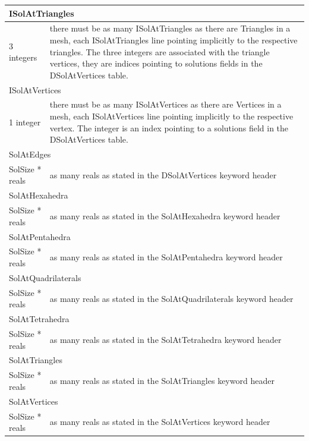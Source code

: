 \documentclass[a4paper,12pt]{article}
\begin{document}
\begin{longtable}{|m{4cm}|m{11cm}|}
\multicolumn{2}{|l|}{ISolAtTriangles} \\
\hline
3 integers & there must be as many ISolAtTriangles as there are Triangles in a mesh, each ISolAtTriangles line pointing implicitly to the respective triangles. The three integers are associated with the triangle vertices, they are indices pointing to solutions fields in the DSolAtVertices table. \\
\hline\hline

\multicolumn{2}{|l|}{ISolAtVertices} \\
\hline
1 integer & there must be as many ISolAtVertices as there are Vertices in a mesh, each ISolAtVertices line pointing implicitly to the respective vertex. The integer is an index pointing to a solutions field in the DSolAtVertices table. \\
\hline\hline

\multicolumn{2}{|l|}{SolAtEdges} \\
\hline
SolSize * reals & as many reals as stated in the DSolAtVertices keyword header \\
\hline\hline

\multicolumn{2}{|l|}{SolAtHexahedra} \\
\hline
SolSize * reals & as many reals as stated in the SolAtHexahedra keyword header \\
\hline\hline

\multicolumn{2}{|l|}{SolAtPentahedra} \\
\hline
SolSize * reals & as many reals as stated in the SolAtPentahedra keyword header \\
\hline\hline

\multicolumn{2}{|l|}{SolAtQuadrilaterals} \\
\hline
SolSize * reals & as many reals as stated in the SolAtQuadrilaterals keyword header \\
\hline\hline

\multicolumn{2}{|l|}{SolAtTetrahedra} \\
\hline
SolSize * reals & as many reals as stated in the SolAtTetrahedra keyword header \\
\hline\hline

\multicolumn{2}{|l|}{SolAtTriangles} \\
\hline
SolSize * reals & as many reals as stated in the SolAtTriangles keyword header \\
\hline\hline

\multicolumn{2}{|l|}{SolAtVertices} \\
\hline
SolSize * reals & as many reals as stated in the SolAtVertices keyword header \\
\hline

\end{longtable}
\end{document}
